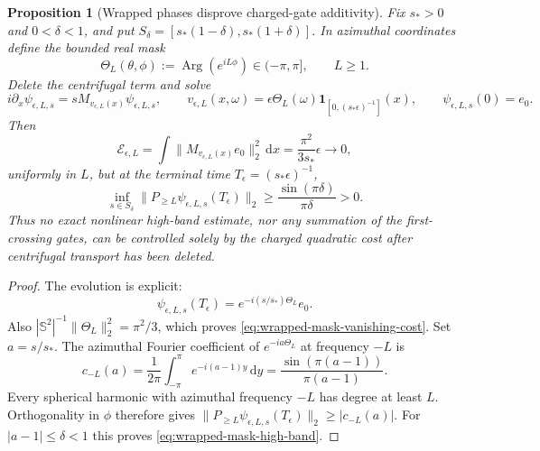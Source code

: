 \documentclass[11pt]{article}
\newcommand{\dd}{\,\mathrm d}
\newtheorem{proposition}[theorem]{Proposition}
\theoremstyle{definition}
\theoremstyle{remark}
\begin{document}
\begin{proposition}[Wrapped phases disprove charged-gate additivity]
\label{prop:wrapped-phase-gate-additivity-no-go}
Fix $s_*>0$ and $0<\delta<1$, and put
$S_\delta=[s_*(1-\delta),s_*(1+\delta)]$.  In azimuthal coordinates define the
bounded real mask
\begin{equation}
 \Theta_L(\theta,\phi)
 :=\operatorname{Arg}(e^{iL\phi})\in(-\pi,\pi],
 \qquad L\geq1.
 \label{eq:wrapped-azimuthal-mask}
\end{equation}
Delete the centrifugal term and solve
\begin{equation}
 i\partial_x\psi_{\epsilon,L,s}
 =sM_{v_{\epsilon,L}(x)}\psi_{\epsilon,L,s},
 \qquad
 v_{\epsilon,L}(x,\omega)
 =\epsilon\Theta_L(\omega)
 \mathbf1_{[0,(s_*\epsilon)^{-1}]}(x),
 \qquad
 \psi_{\epsilon,L,s}(0)=e_0.
 \label{eq:wrapped-mask-evolution}
\end{equation}
Then
\begin{equation}
 \mathcal E_{\epsilon,L}
 =\int\|M_{v_{\epsilon,L}(x)}e_0\|_2^2\dd x
 =\frac{\pi^2}{3s_*}\epsilon\longrightarrow0,
 \label{eq:wrapped-mask-vanishing-cost}
\end{equation}
uniformly in $L$, but at the terminal time
$T_\epsilon=(s_*\epsilon)^{-1}$,
\begin{equation}
 \inf_{s\in S_\delta}
 \|P_{\geq L}\psi_{\epsilon,L,s}(T_\epsilon)\|_2
 \geq
 \frac{\sin(\pi\delta)}{\pi\delta}>0.
 \label{eq:wrapped-mask-high-band}
\end{equation}
Thus no exact nonlinear high-band estimate, nor any summation of the
first-crossing gates, can be controlled solely by the charged quadratic cost
after centrifugal transport has been deleted.
\end{proposition}

\begin{proof}
The evolution is explicit:
\begin{equation}
 \psi_{\epsilon,L,s}(T_\epsilon)
 =e^{-i(s/s_*)\Theta_L}e_0.
\end{equation}
Also
$|\mathbb S^2|^{-1}\|\Theta_L\|_2^2=\pi^2/3$, which proves
\eqref{eq:wrapped-mask-vanishing-cost}.  Set $a=s/s_*$.  The azimuthal Fourier
coefficient of $e^{-ia\Theta_L}$ at frequency $-L$ is
\begin{equation}
 c_{-L}(a)
 =\frac1{2\pi}\int_{-\pi}^{\pi}e^{-i(a-1)y}\dd y
 =\frac{\sin(\pi(a-1))}{\pi(a-1)}.
 \label{eq:wrapped-mask-sinc}
\end{equation}
Every spherical harmonic with azimuthal frequency $-L$ has degree at least
$L$.  Orthogonality in $\phi$ therefore gives
$\|P_{\geq L}\psi_{\epsilon,L,s}(T_\epsilon)\|_2\geq|c_{-L}(a)|$.
For $|a-1|\leq\delta<1$ this proves
\eqref{eq:wrapped-mask-high-band}.
\end{proof}
\end{document}

